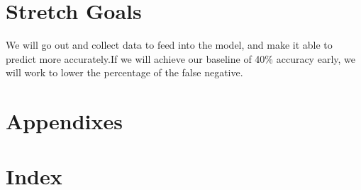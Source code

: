 \documentclass[onecolumn, draftclsnofoot,10pt, compsoc]{IEEEtran}
\begin{document}
\section{Stretch Goals}

		 We will go out and collect data to feed into the model, and make it able to predict more accurately.If we will achieve our baseline of 40\% accuracy\cite{OtherResearch} early, we will work to lower the percentage of the false negative. 

\section*{Appendixes}
\section*{Index}




\end{document}
